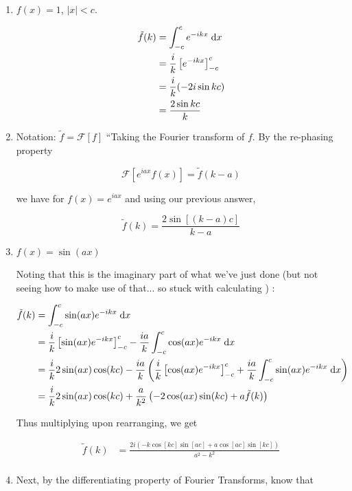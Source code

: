 \documentclass[a4paper]{article}
\begin{document}
\begin{enumerate}
	\item $ f(x) = 1 $, $ | x | < c $.
	
	\begin{align*}
	\tilde{f}(k)  & = \int_{-c}^{c} e^{-ikx} \; \mathrm{d} x   \\
	& = \frac{i}{k} \left[    e^{-ikx}  \right]_{-c}^{c} \\
	& =  \frac{i}{k}(- 2 i \sin k c) \\
	& = \frac{2 \sin kc}{k}
	\end{align*}
	
	\item
	
	Notation: $ \tilde{f} = \mathcal{F}[f] $ ``Taking the Fourier transform of $ f $. By the re-phasing property
	
	\[ \mathcal{F}[ e^{iax}f(x) ] = \tilde{f}(k-a) \]
	
	we have for $ f(x) = e^{iax} $ and using our previous answer,
	
	\[ \tilde{f}(k) = \frac{2\sin[(k-a)c]}{k-a} \]
	
	\item $ f(x) = \sin (ax) $
	
	Noting that this is the imaginary part of what we've just done (but not seeing how to make use of that... so stuck with calculating ) :
	
	\begin{align*}
	\tilde{f}(k)  & = \int_{-c}^{c} \sin(ax) e^{-ikx} \; \mathrm{d} x   \\
	& = \frac{i}{k} \left[ \sin(ax)e^{-ikx}  \right]_{-c}^{c} - \frac{ia}{k} \int_{-c}^{c} \cos(ax)e^{-ikx} \; \mathrm{d} x  \\
	& = \frac{i}{k} 2\sin(ax)\cos(kc) - \frac{ia}{k} \left(   \frac{i}{k} \left[ \cos(ax)e^{-ikx}  \right]_{-c}^{c} + \frac{ia}{k} \int_{-c}^{c} \sin(ax)e^{-ikx} \; \mathrm{d} x \right) \\
	& = \frac{i}{k} 2\sin(ax)\cos(kc) + \frac{a}{k^{2}} \left(  -2\cos(ax)\sin(kc) + a \tilde{f}(k) \right) 
	\end{align*}
	
	Thus multiplying upon rearranging, we get
	
	\begin{align*}
	\tilde{f}(k) & = \frac{2i \left(  - k \cos[kc]\sin[ac] + a \cos[ac]\sin[kc]   \right)}{a^{2} - k^{2}} \\
	\end{align*}
	
	\item Next, by the differentiating property of Fourier Transforms, know that
	

\end{enumerate}
\end{document}
